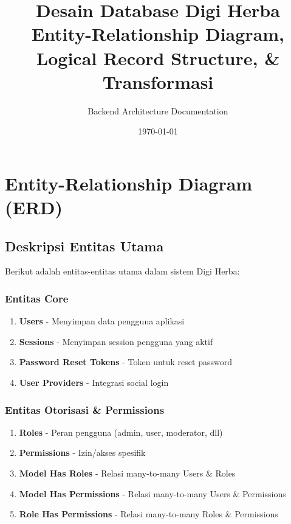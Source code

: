 \documentclass[12pt,a4paper]{article}
\title{\textbf{Desain Database Digi Herba}\\Entity-Relationship Diagram, Logical Record Structure, \& Transformasi}
\author{Backend Architecture Documentation}
\date{\today}
\begin{document}
\maketitle
\newpage

\tableofcontents
\newpage

\section{Entity-Relationship Diagram (ERD)}

\subsection{Deskripsi Entitas Utama}

Berikut adalah entitas-entitas utama dalam sistem Digi Herba:

\subsubsection{Entitas Core}
\begin{enumerate}
    \item \textbf{Users} - Menyimpan data pengguna aplikasi
    \item \textbf{Sessions} - Menyimpan session pengguna yang aktif
    \item \textbf{Password Reset Tokens} - Token untuk reset password
    \item \textbf{User Providers} - Integrasi social login
\end{enumerate}

\subsubsection{Entitas Otorisasi \& Permissions}
\begin{enumerate}
    \item \textbf{Roles} - Peran pengguna (admin, user, moderator, dll)
    \item \textbf{Permissions} - Izin/akses spesifik
    \item \textbf{Model Has Roles} - Relasi many-to-many Users \& Roles
    \item \textbf{Model Has Permissions} - Relasi many-to-many Users \& Permissions
    \item \textbf{Role Has Permissions} - Relasi many-to-many Roles \& Permissions
\end{enumerate}
\end{document}
